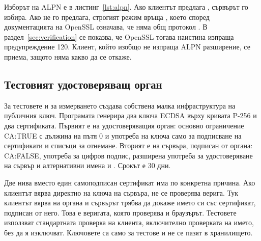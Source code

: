 Изборът на ALPN е в листинг~\ref{lst:alpn}. Ако клиентът предлага ,
сървърът го избира. Ако не го предлага, строгият режим връща
, което според документацията на OpenSSL означава,
че няма общ протокол \cite{openssl_alpn}. В раздел~\ref{sec:verification} се показва, че
OpenSSL тогава наистина изпраща предупреждение 120. Клиент, който изобщо не изпраща ALPN
разширение, се приема, защото няма какво да се откаже.



\subsection{Тестовият удостоверяващ орган}

За тестовете и за измерването  създава собствена малка инфраструктура на
публичния ключ. Програмата  генерира два ключа ECDSA върху кривата
P-256 и два сертификата. Първият е на удостоверяващия орган: основно ограничение
CA:TRUE с дължина на пътя 0 и употреба на ключа само за подписване на сертификати и
списъци за отнемане. Вторият е на сървъра, подписан от органа: CA:FALSE, употреба за
цифров подпис, разширена употреба за удостоверяване на сървър и алтернативни имена
 и . Срокът е 30 дни.

Две нива вместо един самоподписан сертификат има по конкретна причина. Ако клиентът
вярва директно на ключа на сървъра, не се проверява верига. Тук клиентът вярва на органа
и сървърът трябва да докаже името си със сертификат, подписан от него. Това е веригата,
която проверява и браузърът. Тестовете използват стандартната проверка на клиента,
включително проверката на името, без да я изключват. Ключовете са само за тестове и не
се пазят в хранилището.
